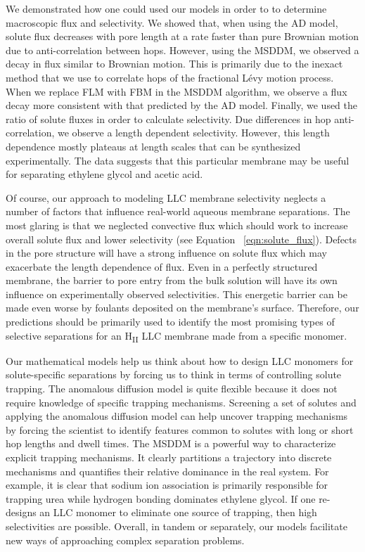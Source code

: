 \documentclass[12pt]{article}
\begin{document}
  We demonstrated how one could used our models in order to to determine
  macroscopic flux and selectivity. We showed that, when using the AD model, 
  solute flux decreases with pore length at a rate faster than pure 
  Brownian motion due to anti-correlation between hops. However, using the
  MSDDM, we observed a decay in flux similar to Brownian motion. This is
  primarily due to the inexact method that we use to correlate hops of the 
  fractional L\'evy motion process. When we replace FLM with FBM in the 
  MSDDM algorithm, we observe a flux decay more consistent with that predicted
  by the AD model. Finally, we used the ratio of solute fluxes in order to
  calculate selectivity. Due differences in hop anti-correlation, we observe
  a length dependent selectivity. However, this length dependence mostly
  plateaus at length scales that can be synthesized experimentally. The data
  suggests that this particular membrane may be useful for separating
  ethylene glycol and acetic acid.

  Of course, our approach to modeling LLC membrane selectivity neglects a number
  of factors that influence real-world aqueous membrane separations. The most 
  glaring is that we neglected convective flux which should work to increase 
  overall solute flux and lower selectivity (see Equation ~\ref{eqn:solute_flux}).
  Defects in the pore structure will have a strong influence on solute flux which
  may exacerbate the length dependence of flux. Even in a perfectly structured 
  membrane, the barrier to pore entry from the bulk solution will have its own 
  influence on experimentally observed selectivities. This energetic barrier can 
  be made even worse by foulants deposited on the membrane's surface. Therefore,
  our predictions should be primarily used to identify the most promising types
  of selective separations for an H\textsubscript{II} LLC membrane made from a 
  specific monomer.

  Our mathematical models help us think about how to design LLC monomers for 
  solute-specific separations by forcing us to think in terms of controlling 
  solute trapping. The anomalous diffusion model is quite flexible because it
  does not require knowledge of specific trapping mechanisms. Screening a set
  of solutes and applying the anomalous diffusion model can help uncover
  trapping mechanisms by forcing the scientist to identify features common 
  to solutes with long or short hop lengths and dwell times. The MSDDM is a 
  powerful way to characterize explicit trapping mechanisms. It clearly
  partitions a trajectory into discrete mechanisms and quantifies their
  relative dominance in the real system. For example, it is clear that 
  sodium ion association is primarily responsible for trapping urea while 
  hydrogen bonding dominates ethylene glycol. If one re-designs an LLC monomer
  to eliminate one source of trapping, then high selectivities are possible.
  Overall, in tandem or separately, our models facilitate new ways of approaching
  complex separation problems.
  
\end{document}

